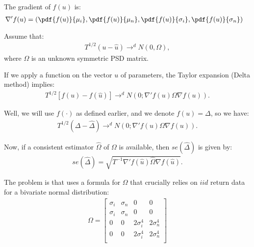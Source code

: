 \documentclass[12pt,oneside,a4paper]{article}
\begin{document}
The gradient of $f(u)$ is:
\begin{align*}
\nabla' f(u) &=
\left( 
\pdf{f(u)}{\mu_{i}},
\pdf{f(u)}{\mu_{n}},
\pdf{f(u)}{\sigma_{i}},
\pdf{f(u)}{\sigma_{n}}
\right)
\end{align*}

% 
Assume that:
\begin{align*}
	T^{1/2}(u - \hat{u}) \to^d N(0, \Omega),
\end{align*}
where $\Omega$ is an unknown symmetric PSD matrix.

If we apply a function on the vector $u$ of parameters, the Taylor expansion (Delta method) implies:
\begin{align*}
T^{1/2}[f(u) - f(\hat{u})] \to^d N \left( 0; \nabla'f(u) \Omega \nabla f(u)  \right).
\end{align*}

Well, we will use $f(\cdot)$ as defined earlier, and we denote $f(u) = \Delta$, so we have:
\begin{align*}
T^{1/2}(\Delta - \hat{\Delta}) 	\to^d N \left( 0; \nabla'f(u) \Omega \nabla f(u)  \right).
\end{align*}

Now, if a consistent estimator $\hat{\Omega}$ of $\Omega$ is available, then $se(\hat{\Delta})$ is given by:
\begin{align}
se(\hat{\Delta}) = \sqrt{T^{-1} \nabla'f(\hat{u}) \hat{\Omega} \nabla f(\hat{u})}.
\end{align}

The problem is that \cite{jb81-sr} uses a formula for $\Omega$ that crucially relies on $iid$ return data for a bivariate normal distribution:
\begin{align*}
\Omega = 
\begin{bmatrix}
\sigma_{i} & \sigma_{n} & 0 & 0 \\
\sigma_{i} & \sigma_{n} & 0 & 0 \\
0 & 0 & 2\sigma^{4}_{i} & 2\sigma^{4}_{n}  \\
0 & 0 & 2\sigma^{4}_{i} & 2\sigma^{4}_{n}  \\
\end{bmatrix}
\end{align*}
\end{document}
